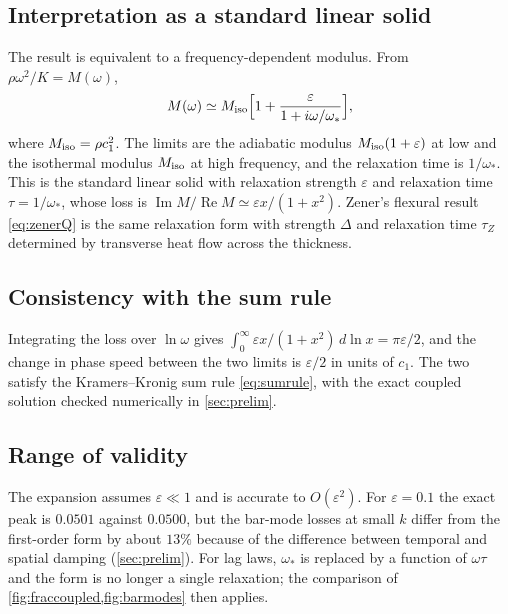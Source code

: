 \subsection{Interpretation as a standard linear solid}
The result is equivalent to a frequency-dependent modulus. From $\rho\omega^2/K=M(\omega)$,
\begin{equation}
M(\omega)\simeq M_{\rm iso}\Bigl[1+\frac{\varepsilon}{1+i\omega/\omega_*}\Bigr],
\end{equation}
where $M_{\rm iso}=\rho c_1^2$. The limits are the adiabatic modulus $M_{\rm iso}(1+\varepsilon)$ at low and the isothermal modulus $M_{\rm iso}$ at high frequency, and the relaxation time is $1/\omega_*$. This is the standard linear solid with relaxation strength $\varepsilon$ and relaxation time $\tau=1/\omega_*$, whose loss is $\operatorname{Im}M/\operatorname{Re}M\simeq\varepsilon x/(1+x^2)$. Zener's flexural result \cref{eq:zenerQ} is the same relaxation form with strength $\Delta$ and relaxation time $\tau_Z$ determined by transverse heat flow across the thickness.

\subsection{Consistency with the sum rule}
Integrating the loss over $\ln\omega$ gives $\int_0^\infty\varepsilon x/(1+x^2)\,d\ln x=\pi\varepsilon/2$, and the change in phase speed between the two limits is $\varepsilon/2$ in units of $c_1$. The two satisfy the Kramers--Kronig sum rule \cref{eq:sumrule}, with the exact coupled solution checked numerically in \cref{sec:prelim}.

\subsection{Range of validity}
The expansion assumes $\varepsilon\ll1$ and is accurate to $O(\varepsilon^2)$. For $\varepsilon=0.1$ the exact peak is $0.0501$ against $0.0500$, but the bar-mode losses at small $k$ differ from the first-order form by about $13\%$ because of the difference between temporal and spatial damping (\cref{sec:prelim}). For lag laws, $\omega_*$ is replaced by a function of $\omega\tau$ and the form is no longer a single relaxation; the comparison of \cref{fig:fraccoupled,fig:barmodes} then applies.
